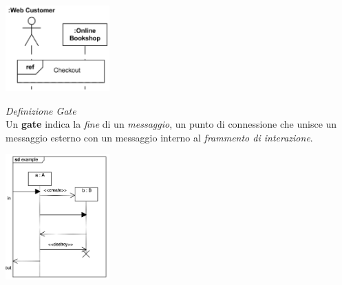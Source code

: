 \documentclass{article}
\begin{document}
\begin{enumerate}
\begin{enumerate}[label={ }]
                                \begin{center}
                                    \includegraphics[width=0.3\textwidth]{foto 11.png}
                                \end{center}
                            \end{enumerate}
\end{enumerate}
\textit{Definizione Gate}\\
Un \textbf{gate} indica la \textit{fine} di un \textit{messaggio}, un punto di connessione che unisce un messaggio esterno con un messaggio interno al\textit{ frammento di interazione}.\vspace*{14pt}
\begin{center}
    \includegraphics[width=0.3\textwidth]{foto 12.png}\\
\end{center}
\end{document}
